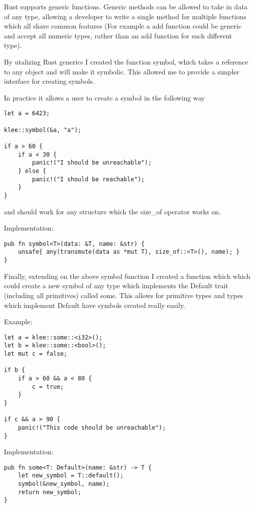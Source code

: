 \documentclass{report}
\begin{document}
Rust supports generic functions. Generic methods can be allowed to take in data of any type, allowing a developer to write a single method for multiple functions which all share common features (For example a add function could be generic and accept all numeric types, rather than an add function for each different type).

By utalizing Rust generics I created the function symbol, which takes a reference to any object and will make it symbolic. This allowed me to provide a simpler interface for creating symbols.

In practice it allows a user to create a symbol in the following way

\begin {lstlisting}
let a = 6423;

klee::symbol(&a, "a");

if a > 60 {
	if a < 30 {
		panic!("I should be unreachable");
	} else {
		panic!("I should be reachable");
	}
}
\end {lstlisting}

and should work for any structure which the size_of operator works on.

Implementation:

\begin {lstlisting}
pub fn symbol<T>(data: &T, name: &str) {
    unsafe{ any(transmute(data as *mut T), size_of::<T>(), name); }
}
\end {lstlisting}

Finally, extending on the above symbol function I created a function which which could create a new symbol of any type which implements the Default trait (including all primitives) called some. This allows for primitive types and types which implement Default have symbols created really easily.

Example:
\begin{lstlisting}
let a = klee::some::<i32>();
let b = klee::some::<bool>();
let mut c = false;

if b {
	if a > 60 && a < 80 {
		c = true;
	}
}

if c && a > 90 {
	panic!("This code should be unreachable");
}
\end{lstlisting}

Implementation:
\begin{lstlisting}
pub fn some<T: Default>(name: &str) -> T {
    let new_symbol = T::default();
    symbol(&new_symbol, name);
    return new_symbol;
}
\end{lstlisting}
\end{document}
